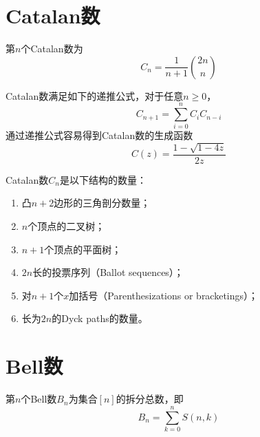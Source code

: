 \section{Catalan数}
\begin{definition}
	第$n$个Catalan数为
	\begin{equation*}
		C_n = \frac{1}{n+1}\binom{2n}{n}
	\end{equation*}
\end{definition}
Catalan数满足如下的递推公式，对于任意$n\geq 0$，
\begin{equation*}
	C_{n+1} = \sum\limits_{i=0}^nC_iC_{n-i}
\end{equation*}
通过递推公式容易得到Catalan数的生成函数
\begin{equation*}
	C(z) = \frac{1-\sqrt{1-4z}}{2z}
\end{equation*}
\begin{theorem}
	Catalan数$C_n$是以下结构的数量：
	\begin{enumerate}
		\item 凸$n+2$边形的三角剖分数量；
		\item $n$个顶点的二叉树；
		\item $n+1$个顶点的平面树；
		\item $2n$长的投票序列（Ballot sequences）；
		\item 对$n+1$个$x$加括号（Parenthesizations or bracketings）；
		\item 长为$2n$的Dyck paths的数量。
	\end{enumerate}
\end{theorem}
\section{Bell数}
\begin{definition}
	第$n$个Bell数$B_n$为集合$[n]$的拆分总数，即
	\begin{equation*}
		B_n = \sum\limits_{k=0}^n S(n, k)
	\end{equation*}
\end{definition}